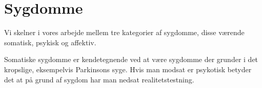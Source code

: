 \section{Sygdomme}
Vi skelner i vores arbejde mellem tre kategorier af sygdomme, disse værende somatisk, psykisk og affektiv.

Somatiske sygdomme er kendetegnende ved at være sygdomme der grunder i det kropslige, eksempelvis Parkinsons syge.
Hvis man modsat er psykotisk betyder det at på grund af sygdom har man nedsat realitetstestning\citep{}.